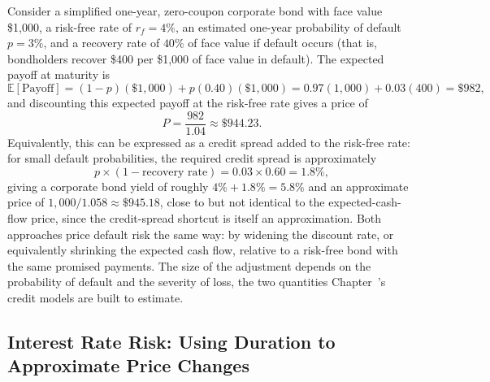 \documentclass[../ai_in_finance]{subfiles}
\begin{document}
Consider a simplified one-year, zero-coupon corporate bond with face value \$1,000, a risk-free rate of $r_f=4\%$, an estimated one-year probability of default $p=3\%$, and a recovery rate of $40\%$ of face value if default occurs (that is, bondholders recover \$400 per \$1,000 of face value in default). The expected payoff at maturity is
\begin{equation*}
\mathbb{E}[\text{Payoff}] = (1-p)(\$1{,}000) + p(0.40)(\$1{,}000) = 0.97(1{,}000) + 0.03(400) = \$982,
\end{equation*}
and discounting this expected payoff at the risk-free rate gives a price of
\begin{equation*}
P = \frac{982}{1.04} \approx \$944.23.
\end{equation*}
Equivalently, this can be expressed as a credit spread added to the risk-free rate: for small default probabilities, the required credit spread is approximately
$$p \times (1-\text{recovery rate}) = 0.03 \times 0.60 = 1.8\%,$$
giving a corporate bond yield of roughly $4\% + 1.8\% = 5.8\%$ and an approximate price of $1{,}000/1.058 \approx \$945.18$, close to but not identical to the expected-cash-flow price, since the credit-spread shortcut is itself an approximation. Both approaches price default risk the same way: by widening the discount rate, or equivalently shrinking the expected cash flow, relative to a risk-free bond with the same promised payments. The size of the adjustment depends on the probability of default and the severity of loss, the two quantities Chapter~'s credit models are built to estimate.

\subsection{Interest Rate Risk: Using Duration to Approximate Price Changes}
\label{sec:valuation-duration}
\end{document}
